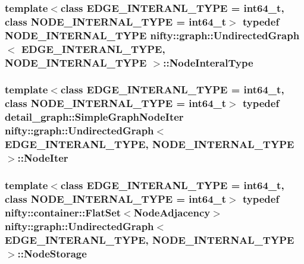 \subsubsection[{Node\+Interal\+Type}]{\setlength{\rightskip}{0pt plus 5cm}template$<$class E\+D\+G\+E\+\_\+\+I\+N\+T\+E\+R\+A\+N\+L\+\_\+\+T\+Y\+P\+E = int64\+\_\+t, class N\+O\+D\+E\+\_\+\+I\+N\+T\+E\+R\+N\+A\+L\+\_\+\+T\+Y\+P\+E = int64\+\_\+t$>$ typedef N\+O\+D\+E\+\_\+\+I\+N\+T\+E\+R\+N\+A\+L\+\_\+\+T\+Y\+P\+E {\bf nifty\+::graph\+::\+Undirected\+Graph}$<$ E\+D\+G\+E\+\_\+\+I\+N\+T\+E\+R\+A\+N\+L\+\_\+\+T\+Y\+P\+E, N\+O\+D\+E\+\_\+\+I\+N\+T\+E\+R\+N\+A\+L\+\_\+\+T\+Y\+P\+E $>$\+::{\bf Node\+Interal\+Type}\hspace{0.3cm}{\ttfamily [protected]}}\label{classnifty_1_1graph_1_1UndirectedGraph_aa3b43dd44281416b7232caae529e8780}
\hypertarget{classnifty_1_1graph_1_1UndirectedGraph_aac54e4ad3a525489e9b29c1bd4c92c88}{}
\subsubsection[{Node\+Iter}]{\setlength{\rightskip}{0pt plus 5cm}template$<$class E\+D\+G\+E\+\_\+\+I\+N\+T\+E\+R\+A\+N\+L\+\_\+\+T\+Y\+P\+E = int64\+\_\+t, class N\+O\+D\+E\+\_\+\+I\+N\+T\+E\+R\+N\+A\+L\+\_\+\+T\+Y\+P\+E = int64\+\_\+t$>$ typedef {\bf detail\+\_\+graph\+::\+Simple\+Graph\+Node\+Iter} {\bf nifty\+::graph\+::\+Undirected\+Graph}$<$ E\+D\+G\+E\+\_\+\+I\+N\+T\+E\+R\+A\+N\+L\+\_\+\+T\+Y\+P\+E, N\+O\+D\+E\+\_\+\+I\+N\+T\+E\+R\+N\+A\+L\+\_\+\+T\+Y\+P\+E $>$\+::{\bf Node\+Iter}}\label{classnifty_1_1graph_1_1UndirectedGraph_aac54e4ad3a525489e9b29c1bd4c92c88}
\hypertarget{classnifty_1_1graph_1_1UndirectedGraph_a3a90ae1386fcc168216856934bf1ec24}{}
\subsubsection[{Node\+Storage}]{\setlength{\rightskip}{0pt plus 5cm}template$<$class E\+D\+G\+E\+\_\+\+I\+N\+T\+E\+R\+A\+N\+L\+\_\+\+T\+Y\+P\+E = int64\+\_\+t, class N\+O\+D\+E\+\_\+\+I\+N\+T\+E\+R\+N\+A\+L\+\_\+\+T\+Y\+P\+E = int64\+\_\+t$>$ typedef {\bf nifty\+::container\+::\+Flat\+Set}$<${\bf Node\+Adjacency}$>$ {\bf nifty\+::graph\+::\+Undirected\+Graph}$<$ E\+D\+G\+E\+\_\+\+I\+N\+T\+E\+R\+A\+N\+L\+\_\+\+T\+Y\+P\+E, N\+O\+D\+E\+\_\+\+I\+N\+T\+E\+R\+N\+A\+L\+\_\+\+T\+Y\+P\+E $>$\+::{\bf Node\+Storage}\hspace{0.3cm}{\ttfamily [protected]}}\label{classnifty_1_1graph_1_1UndirectedGraph_a3a90ae1386fcc168216856934bf1ec24}


